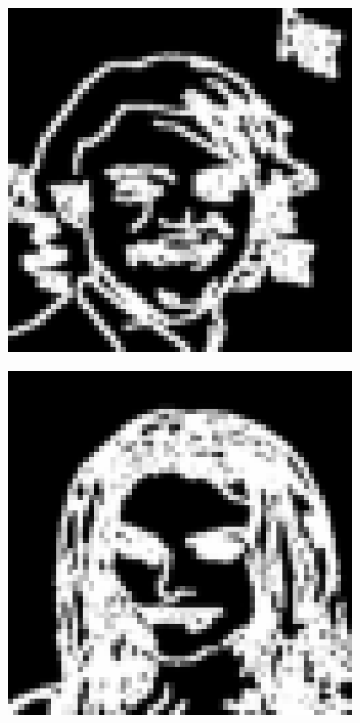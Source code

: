 \documentclass{IEEEcsmag}
\begin{document}
\begin{figure}[ht]
    \smallskip
    \setcounter{subfigure}{0}
    
    \begin{subfigure}{0.12\textwidth}
        \includegraphics[width=\linewidth]{images/CelebA/1/distorted_4.png}
    \end{subfigure}
    \begin{subfigure}{0.12\textwidth}
        \includegraphics[width=\linewidth]{images/CelebA/1/distorted_2.png}

\end{subfigure}
\end{figure}
\end{document}
